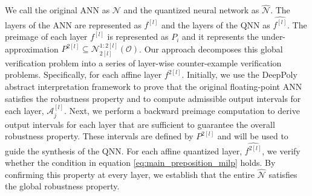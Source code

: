 We call the original ANN as $\mathcal{N}$ and the quantized neural network as ${\hat{\mathcal N}}$. The layers of the ANN are represented as $f^{[l]}$ and the layers of the QNN as $\hat{f^{[l]}}$. The preimage of each layer $f^{[l]}$ is represented as $P_i$ and it represents the under-approximation $P^{2[l]} \subseteq \mathcal N^{1:2[l]}_{2[l]}(\mathcal O)$. Our approach decomposes this global verification problem into a series of layer-wise counter-example verification problems. Specifically, for each affine layer $f^{2[l]}$. Initially, we use the DeepPoly \cite{singhAbstractDomainCertifying2019} abstract interpretation framework to prove that the original floating-point ANN satisfies the robustness property and to compute admissible output intervals for each layer, $\mathcal{A}^{[l]}_{j}$. Next, we perform a backward preimage computation to derive output intervals for each layer that are sufficient to guarantee the overall robustness property. These intervals are defined by $P^{2[l]}$ and will be used to guide the synthesis of the QNN. For each affine quantized layer, $\hat{f^{2[l]}}$, we verify whether the condition in equation \ref{eq:main_preposition_milp} holds. By confirming this property at every layer, we establish that the entire $\mathcal{ \hat{N}}$ satisfies the global robustness property.


